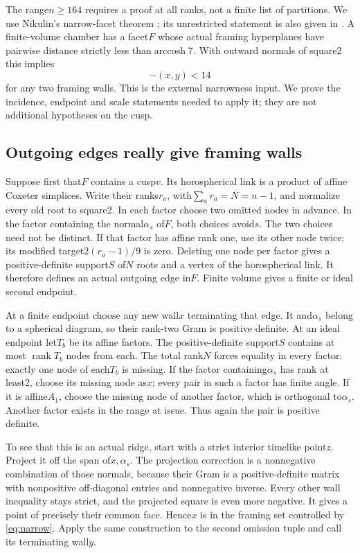\documentclass[11pt]{article}
\theoremstyle{remark}\newtheorem{remark}[theorem]{Remark}
\begin{document}
The range$n\ge164$ requires a proof at all ranks, not a finite list
of partitions. We use Nikulin's narrow-facet theorem
\cite[pp.~654--655]{Nikulin}; its unrestricted statement is also given
in \cite[Section~4, p.~10]{NikulinNarrow}. A finite-volume chamber has a facet$F$
whose actual framing hyperplanes have pairwise distance strictly
less than$\operatorname{arccosh}7$. With outward normals of square2
this implies
\begin{equation}\label{eq:narrow}
 -(x,y)<14
\end{equation}
for any two framing walls. This is the external narrowness input.
We prove the incidence, endpoint and scale statements needed to
apply it; they are not additional hypotheses on the cusp.

\subsection{Outgoing edges really give framing walls}

Suppose first that$F$ contains a cusp$v$. Its horospherical link is
a product of affine Coxeter simplices. Write their ranks$r_a$,
with$\sum_ar_a=N=n-1$, and normalize every old root to square2.
In each factor choose two omitted nodes in advance. In the factor
containing the normal$\alpha_s$ of$F$, both choices avoid$s$.
The two choices need not be distinct. If that factor has affine rank
one, use its other node twice; its modified target$2(r_a-1)/9$ is zero.
Deleting one node per factor gives a positive-definite support$S$
of$N$ roots and a vertex of the horospherical link. It therefore
defines an actual outgoing edge in$F$. Finite volume gives a
finite or ideal second endpoint.

At a finite endpoint choose any new wall$x$ terminating that edge.
It and$\alpha_s$ belong to a spherical diagram, so their rank-two
Gram is positive definite. At an ideal endpoint let$T_b$ be its
affine factors. The positive-definite support$S$ contains at most
$\operatorname{rank}T_b$ nodes from each. The total rank$N$ forces
equality in every factor: exactly one node of each$T_b$ is missing.
If the factor containing$\alpha_s$ has rank at least2, choose its
missing node as$x$; every pair in such a factor has finite angle.
If it is affine$A_1$, choose the missing node of another factor,
which is orthogonal to$\alpha_s$. Another factor exists in the
range at issue. Thus again the pair is positive definite.

To see that this is an actual ridge, start with a strict interior
timelike point$z$. Project it off the span of$x,\alpha_s$.
The projection correction is a nonnegative combination of those
normals, because their Gram is a positive-definite matrix with
nonpositive off-diagonal entries and nonnegative inverse.
Every other wall inequality stays strict, and the projected square
is even more negative. It gives a point of precisely their common
face. Hence$x$ is in the framing set controlled by
\eqref{eq:narrow}. Apply the same construction to the second
omission tuple and call its terminating wall$y$.
\end{document}

